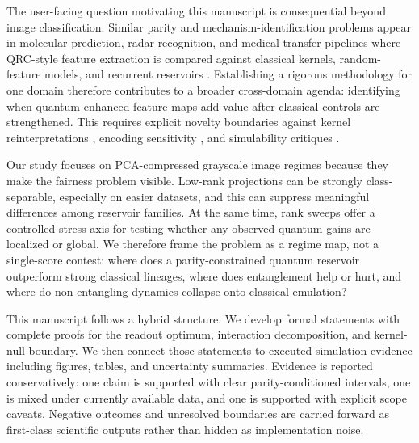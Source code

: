The user-facing question motivating this manuscript is consequential beyond image classification. Similar parity and mechanism-identification problems appear in molecular prediction, radar recognition, and medical-transfer pipelines where QRC-style feature extraction is compared against classical kernels, random-feature models, and recurrent reservoirs \citep{S005,S009,S014,S015,S017,S021,S031}. Establishing a rigorous methodology for one domain therefore contributes to a broader cross-domain agenda: identifying when quantum-enhanced feature maps add value after classical controls are strengthened. This requires explicit novelty boundaries against kernel reinterpretations \citep{S006,S022,S035}, encoding sensitivity \citep{S007,S030}, and simulability critiques \citep{S002,S038}.

Our study focuses on PCA-compressed grayscale image regimes because they make the fairness problem visible. Low-rank projections can be strongly class-separable, especially on easier datasets, and this can suppress meaningful differences among reservoir families. At the same time, rank sweeps offer a controlled stress axis for testing whether any observed quantum gains are localized or global. We therefore frame the problem as a regime map, not a single-score contest: where does a parity-constrained quantum reservoir outperform strong classical lineages, where does entanglement help or hurt, and where do non-entangling dynamics collapse onto classical emulation?

This manuscript follows a hybrid structure. We develop formal statements with complete proofs for the readout optimum, interaction decomposition, and kernel-null boundary. We then connect those statements to executed simulation evidence including figures, tables, and uncertainty summaries. Evidence is reported conservatively: one claim is supported with clear parity-conditioned intervals, one is mixed under currently available data, and one is supported with explicit scope caveats. Negative outcomes and unresolved boundaries are carried forward as first-class scientific outputs rather than hidden as implementation noise.

